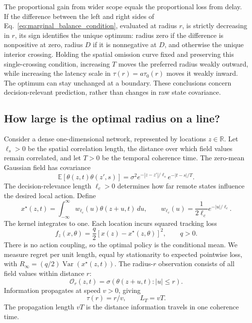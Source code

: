 \documentclass[11pt]{article}
\begin{document}
The proportional gain from wider scope equals the proportional loss from
delay. If the difference between the left and right sides of
Eq.~\eqref{eq:marginal_balance_condition}, evaluated at radius $r$, is
strictly decreasing in $r$, its sign identifies the unique optimum:
radius zero if the difference is nonpositive at zero, radius $D$ if it is
nonnegative at $D$, and otherwise the unique interior crossing.
Holding the spatial omission curve fixed and preserving this single-crossing
condition, increasing $T$ moves the preferred radius weakly outward, while
increasing the latency scale in $\tau(r)=a\tau_0(r)$ moves it weakly inward.
The optimum can stay unchanged at a boundary. These conclusions concern
decision-relevant prediction, rather than changes in raw state covariance.

\subsection{How large is the optimal radius on a line?}
\label{subsec:canonical_line_model}

Consider a dense one-dimensional network, represented by locations
$z\in\mathbb R$. Let $\ell_s>0$ be the spatial correlation length, the
distance over which field values remain correlated, and let $T>0$ be the
temporal coherence time. The zero-mean Gaussian field has covariance
\begin{equation}
\mathbb E[\theta(z,t)\theta(z',s)]
=\sigma^2e^{-|z-z'|/\ell_s}e^{-|t-s|/T}.
\label{eq:canonical_space_time_covariance}
\end{equation}
The decision-relevance length $\ell_c>0$ determines how far remote states
influence the desired local action. Define
\begin{equation}
x^\star(z,t)=\int_{-\infty}^{\infty}w_{\ell_c}(u)\theta(z+u,t)\,du,
\qquad w_{\ell_c}(u)=\frac{1}{2\ell_c}e^{-|u|/\ell_c}.
\label{eq:canonical_target}
\end{equation}
The kernel integrates to one. Each location incurs squared tracking loss
\begin{equation}
f_z(x,\theta)=\frac q2[x(z)-x^\star(z,\theta)]^2,\qquad q>0.
\label{eq:canonical_tracking_cost}
\end{equation}
There is no action coupling, so the optimal policy is the conditional mean.
We measure regret per unit length, equal by stationarity to expected
pointwise loss, with $R_\infty=(q/2)\operatorname{Var}(x^\star(z,t))$.
The radius-$r$ observation consists of all field values within distance $r$:
\begin{equation}
\mathcal O_r(z,t)=\sigma(\theta(z+u,t):|u|\le r).
\label{eq:canonical_radius_observation}
\end{equation}
Information propagates at speed $v>0$, giving
\begin{equation}
\tau(r)=r/v,\qquad L_T=vT.
\label{eq:temporal_propagation_length}
\end{equation}
The propagation length $vT$ is the distance information travels in one
coherence time.
\end{document}
